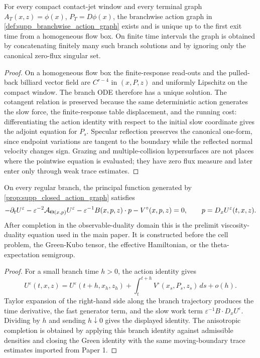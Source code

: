\begin{proposition}
\label{prop:supp_closed_action_graph}
For every compact contact-jet window and every terminal graph
\(A_T(x,z)=\phi(x)\), \(P_T=D\phi(x)\), the branchwise action graph in
\cref{def:supp_branchwise_action_graph} exists and is unique up to the first
exit time from a homogeneous flow box.  On finite time intervals the graph is
obtained by concatenating finitely many such branch solutions and by ignoring
only the canonical zero-flux singular set.
\end{proposition}

\begin{proof}
On a homogeneous flow box the finite-response read-outs and the pulled-back
billiard vector field are \(C^{r-4}\) in \((x,P,z)\) and uniformly Lipschitz on
the compact window.  The branch ODE therefore has a unique solution.  The
cotangent relation is preserved because the same deterministic action generates
the slow force, the finite-response table displacement, and the running cost:
differentiating the action identity with respect to the initial slow coordinate
gives the adjoint equation for \(P_s\).  Specular reflection preserves the
canonical one-form, since endpoint variations are tangent to the boundary while
the reflected normal velocity changes sign.  Grazing and multiple-collision
hypersurfaces are not places where the pointwise equation is evaluated; they
have zero flux measure and later enter only through weak trace estimates.
\end{proof}

\begin{theorem}
\label{thm:supp_exact_prelimit_hj}
On every regular branch, the principal function generated by
\cref{prop:supp_closed_action_graph} satisfies
\[
  -\partial_t U^\varepsilon
  -\varepsilon^{-2}\mathcal A_{\Theta(x,p)}U^\varepsilon
  -\varepsilon^{-1}B(x,p,z)\cdot p
  -V^\circ(x,p,z)=0,
  \qquad p=D_xU^\varepsilon(t,x,z).
\]
After completion in the observable-duality domain this is the prelimit
viscosity-duality equation used in the main paper.  It is constructed before
the cell problem, the Green-Kubo tensor, the effective Hamiltonian, or the
theta-expectation semigroup.
\end{theorem}

\begin{proof}
For a small branch time \(h>0\), the action identity gives
\[
  U^\varepsilon(t,x,z)
  =
  U^\varepsilon(t+h,x_h,z_h)
  +\int_t^{t+h} V^\circ(x_s,P_s,z_s)\,ds+o(h).
\]
Taylor expansion of the right-hand side along the branch trajectory produces
the time derivative, the fast generator term, and the slow work term
\(\varepsilon^{-1}B\cdot D_xU^\varepsilon\).  Dividing by \(h\) and sending
\(h\downarrow0\) gives the displayed identity.  The anisotropic completion is
obtained by applying this branch identity against admissible densities and
closing the Green identity with the same moving-boundary trace estimates
imported from Paper 1.
\end{proof}

